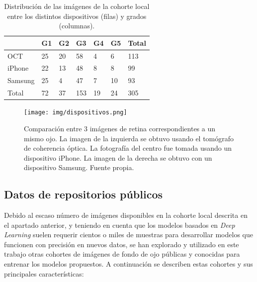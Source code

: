 \begin{table}[h]
\centering
\begin{tabular}{@{}llllll|l@{}}
\toprule
\rowcolor[HTML]{C0C0C0}
        & G1 & G2 & G3  & G4 & G5 & Total \\ \midrule
OCT     & 25 & 20 & 58  & 4  & 6  & 113   \\
iPhone  & 22 & 13 & 48  & 8  & 8  & 99    \\
Samsung & 25 & 4  & 47  & 7  & 10 & 93    \\ \midrule
Total   & 72 & 37 & 153 & 19 & 24 & 305   \\ \bottomrule
\end{tabular}
\caption{Distribución de las imágenes de la cohorte local entre los distintos dispositivos (filas) y grados (columnas).}
\label{tab:cohorte}
\end{table}

\begin{figure}[h]
    \centering
    \texttt{[image: img/dispositivos.png]}
    \caption{Comparación entre 3 imágenes de retina correspondientes a un mismo ojo. La imagen de la izquierda se obtuvo usando el tomógrafo de coherencia óptica. La fotografía del centro fue tomada usando un dispositivo iPhone. La imagen de la derecha se obtuvo con un dispositivo Samsung. Fuente propia.}
    \label{fig:comp_dispositivos}
\end{figure}

\subsection{Datos de repositorios públicos}

Debido al escaso número de imágenes disponibles en la cohorte local descrita en el apartado anterior, y teniendo en cuenta que los modelos basados en \textit{Deep Learning} suelen requerir cientos o miles de muestras para desarrollar modelos que funcionen con precisión en nuevos datos, se han explorado y utilizado en este trabajo otras cohortes de imágenes de fondo de ojo públicas y conocidas para entrenar los modelos propuestos. A continuación se describen estas cohortes y sus principales características:

